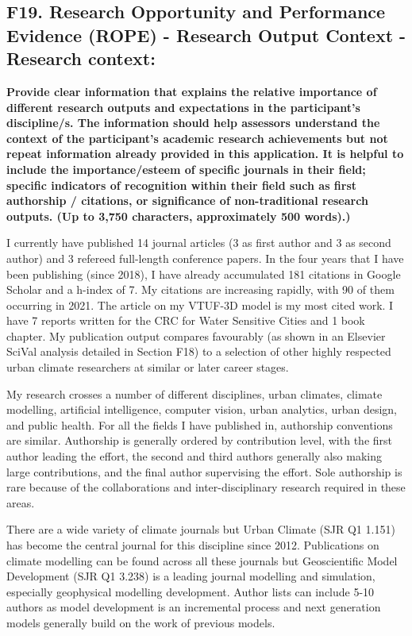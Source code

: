 \subsection*{\TitleFont F19. Research Opportunity and Performance Evidence (ROPE) - Research Output Context - Research context: }

\textbf{Provide clear information that explains the relative importance of different research outputs and expectations in the participant's discipline/s. The information should help assessors understand the context of the participant's academic research achievements but not repeat information already provided in this application. It is helpful to include the importance/esteem of specific journals in their field; specific indicators of recognition within their field such as first authorship / citations, or significance of non-traditional research outputs. (Up to 3,750 characters, approximately 500 words).)}

I currently have published 14 journal articles (3 as first author and 3 as second author) and 3 refereed full-length conference papers. In the four years that I have been publishing (since 2018), I have already accumulated 181 citations in Google Scholar and a h-index of 7. My citations are increasing rapidly, with 90 of them occurring in 2021. The article on my VTUF-3D model is my most cited work. I have 7 reports written for the CRC for Water Sensitive Cities and 1 book chapter. My publication output compares favourably (as shown in an Elsevier SciVal analysis detailed in Section F18) to a selection of other highly respected urban climate researchers at similar or later career stages. 

My research crosses a number of different disciplines, urban climates, climate modelling, artificial intelligence, computer vision, urban analytics, urban design, and public health. For all the fields I have published in, authorship conventions are similar. Authorship is generally ordered by contribution level, with the first author leading the effort, the second and third authors generally also making large contributions, and the final author supervising the effort. Sole authorship is rare because of the collaborations and inter-disciplinary research required in these areas.

There are a wide variety of climate journals but Urban Climate (SJR Q1 1.151) has become the central journal for this discipline since 2012. Publications on climate modelling can be found across all these journals but Geoscientific Model Development (SJR Q1 3.238) is a leading journal modelling and simulation, especially geophysical modelling development. Author lists can include 5-10 authors as model development is an incremental process and next generation models generally build on the work of previous models.

